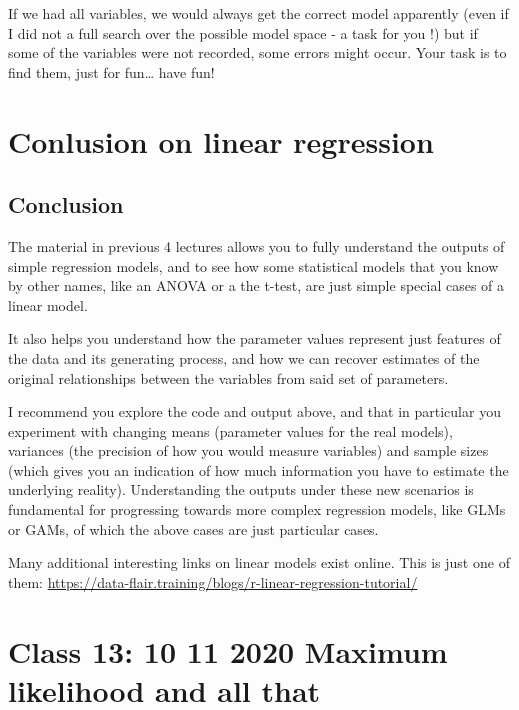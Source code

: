 \documentclass[
]{book}
\begin{document}
If we had all variables, we would always get the correct model apparently (even if I did not a full search over the possible model space - a task for you !) but if some of the variables were not recorded, some errors might occur. Your task is to find them, just for fun\ldots{} have fun!

\hypertarget{conlusion-on-linear-regression}{%
\chapter{Conlusion on linear regression}\label{conlusion-on-linear-regression}}

\hypertarget{conclusion}{%
\section{Conclusion}\label{conclusion}}

The material in previous 4 lectures allows you to fully understand the outputs of simple regression models, and to see how some statistical models that you know by other names, like an ANOVA or a the t-test, are just simple special cases of a linear model.

It also helps you understand how the parameter values represent just features of the data and its generating process, and how we can recover estimates of the original relationships between the variables from said set of parameters.

I recommend you explore the code and output above, and that in particular you experiment with changing means (parameter values for the real models), variances (the precision of how you would measure variables) and sample sizes (which gives you an indication of how much information you have to estimate the underlying reality). Understanding the outputs under these new scenarios is fundamental for progressing towards more complex regression models, like GLMs or GAMs, of which the above cases are just particular cases.

Many additional interesting links on linear models exist online. This is just one of them: \url{https://data-flair.training/blogs/r-linear-regression-tutorial/}

\hypertarget{aula12}{%
\chapter{Class 13: 10 11 2020 Maximum likelihood and all that}\label{aula12}}
\end{document}
